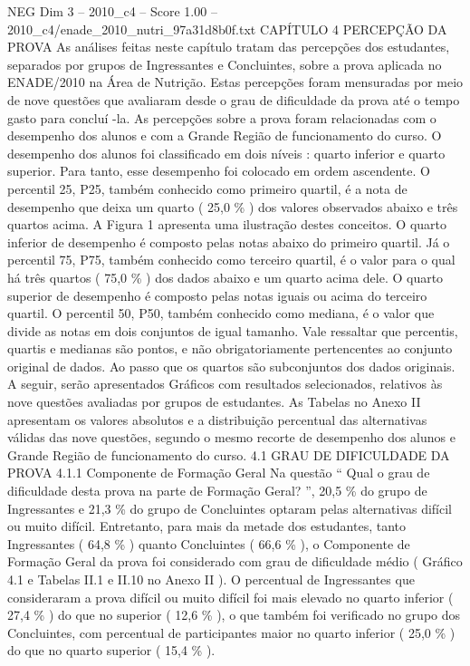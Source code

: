 \begin{textsample}{NEG Dim 3 – 2010\_c4 – Score 1.00 – 2010\_c4/enade\_2010\_nutri\_97a31d8b0f.txt}  \label{ex:f3_neg_124}
CAPÍTULO 4 PERCEPÇÃO DA PROVA As análises feitas neste capítulo tratam das percepções dos estudantes, separados por grupos de Ingressantes e Concluintes, sobre a prova aplicada no ENADE/2010 na Área de Nutrição.
Estas percepções foram mensuradas por meio de nove questões que avaliaram desde o grau de dificuldade da prova até o tempo gasto para concluí -la.
As percepções sobre a prova foram relacionadas com o desempenho dos alunos e com a Grande Região de funcionamento do curso.
O desempenho dos alunos foi classificado em dois níveis : quarto inferior e quarto superior.
Para tanto, esse desempenho foi colocado em ordem ascendente.
O percentil 25, P25, também conhecido como primeiro quartil, é a nota de desempenho que deixa um quarto ( 25,0 \% ) dos valores observados abaixo e três quartos acima.
A Figura 1 apresenta uma ilustração destes conceitos.
O quarto inferior de desempenho é composto pelas notas abaixo do primeiro quartil.
Já o percentil 75, P75, também conhecido como terceiro quartil, é o valor para o qual há três quartos ( 75,0 \% ) dos dados abaixo e um quarto acima dele.
O quarto superior de desempenho é composto pelas notas iguais ou acima do terceiro quartil.
O percentil 50, P50, também conhecido como mediana, é o valor que divide as notas em dois conjuntos de igual tamanho.
Vale ressaltar que percentis, quartis e medianas são pontos, e não obrigatoriamente pertencentes ao conjunto original de dados.
Ao passo que os quartos são subconjuntos dos dados originais.
A seguir, serão apresentados Gráficos com resultados selecionados, relativos às nove questões avaliadas por grupos de estudantes.
As Tabelas no Anexo II apresentam os valores absolutos e a distribuição percentual das alternativas válidas das nove questões, segundo o mesmo recorte de desempenho dos alunos e Grande Região de funcionamento do curso. 4.1 GRAU DE DIFICULDADE DA PROVA 4.1.1 Componente de Formação Geral Na questão “ Qual o grau de dificuldade desta prova na parte de Formação Geral? ”, 20,5 \% do grupo de Ingressantes e 21,3 \% do grupo de Concluintes optaram pelas alternativas difícil ou muito difícil.
Entretanto, para mais da metade dos estudantes, tanto Ingressantes ( 64,8 \% ) quanto Concluintes ( 66,6 \% ), o Componente de Formação Geral da prova foi considerado com grau de dificuldade médio ( Gráfico 4.1 e Tabelas II.1 e II.10 no Anexo II ).
O percentual de Ingressantes que consideraram a prova difícil ou muito difícil foi mais elevado no quarto inferior ( 27,4 \% ) do que no superior ( 12,6 \% ), o que também foi verificado no grupo dos Concluintes, com percentual de participantes maior no quarto inferior ( 25,0 \% ) do que no quarto superior ( 15,4 \% ).

\end{textsample}
